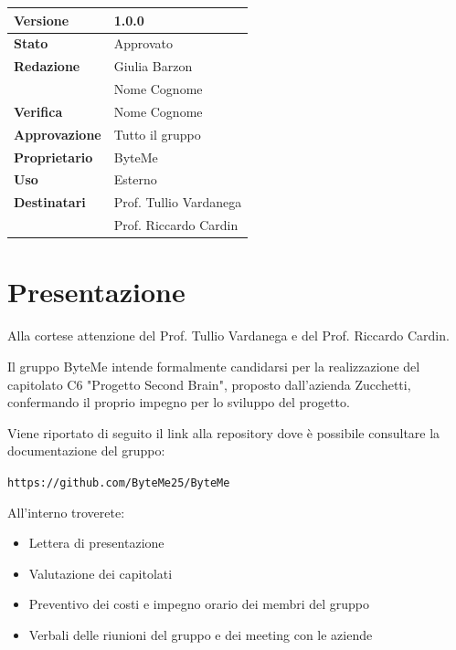 \documentclass[11pt,a4paper]{article}
\begin{document}
\begin{titlepage}
    \begin{table}[H]
        \centering
        \begin{tabular}{|l|p{5cm}|}
            \hline
            \textbf{Versione} & 1.0.0 \\
            \hline
            \textbf{Stato} & Approvato \\
            \hline
            \textbf{Redazione} & Giulia Barzon \\ & Nome Cognome \\
            \hline
            \textbf{Verifica} & Nome Cognome \\
            \hline
            \textbf{Approvazione} & Tutto il gruppo \\
            \hline
            \textbf{Proprietario} & ByteMe \\
            \hline
            \textbf{Uso} & Esterno \\
            \hline
            \textbf{Destinatari} & Prof. Tullio Vardanega \\ & Prof. Riccardo Cardin \\
            \hline
        \end{tabular}
    \end{table}
    
    \vfill
\end{titlepage}

\tableofcontents
\thispagestyle{empty}
\newpage

\setcounter{page}{1}

\section{Presentazione}
Alla cortese attenzione del Prof. Tullio Vardanega e del Prof. Riccardo Cardin.

Il gruppo ByteMe intende formalmente candidarsi per la realizzazione del capitolato C6 "Progetto Second Brain", proposto dall'azienda Zucchetti, confermando il proprio impegno per lo sviluppo del progetto.

Viene riportato di seguito il link alla repository dove è possibile consultare la documentazione del gruppo:
\begin{center}
\texttt{https://github.com/ByteMe25/ByteMe}
\end{center}

\noindent All'interno troverete:
\begin{itemize}
    \item Lettera di presentazione
    \item Valutazione dei capitolati
    \item Preventivo dei costi e impegno orario dei membri del gruppo
    \item Verbali delle riunioni del gruppo e dei meeting con le aziende
\end{itemize}
\end{document}
